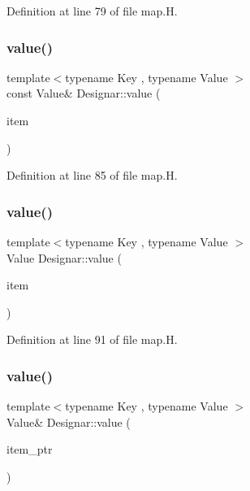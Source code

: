Definition at line 79 of file map.\+H.

\mbox{\label{namespace_designar_a0b1fbaad8d9cadc07bd73cd65baf6b3f}} 
\subsubsection{\texorpdfstring{value()}{value()}\hspace{0.1cm}{\footnotesize\ttfamily [2/4]}}
{\footnotesize\ttfamily template$<$typename Key , typename Value $>$ \\
const Value\& Designar\+::value (\begin{DoxyParamCaption}\item[{const \hyperlink{namespace_designar_a7394b1b25278abf7211e77b91eb5204f}{Map\+Key}$<$ Key, Value $>$ \&}]{item }\end{DoxyParamCaption})}



Definition at line 85 of file map.\+H.

\mbox{\label{namespace_designar_a54c38cc2398cdee4d9641ed50f43110b}} 
\subsubsection{\texorpdfstring{value()}{value()}\hspace{0.1cm}{\footnotesize\ttfamily [3/4]}}
{\footnotesize\ttfamily template$<$typename Key , typename Value $>$ \\
Value Designar\+::value (\begin{DoxyParamCaption}\item[{\hyperlink{namespace_designar_a7394b1b25278abf7211e77b91eb5204f}{Map\+Key}$<$ Key, Value $>$ \&\&}]{item }\end{DoxyParamCaption})}



Definition at line 91 of file map.\+H.

\mbox{\label{namespace_designar_a93bd8a834a0093067e2da608fc18e4e4}} 
\subsubsection{\texorpdfstring{value()}{value()}\hspace{0.1cm}{\footnotesize\ttfamily [4/4]}}
{\footnotesize\ttfamily template$<$typename Key , typename Value $>$ \\
Value\& Designar\+::value (\begin{DoxyParamCaption}\item[{\hyperlink{namespace_designar_a7394b1b25278abf7211e77b91eb5204f}{Map\+Key}$<$ Key, Value $>$ $\ast$}]{item\+\_\+ptr }\end{DoxyParamCaption})}



